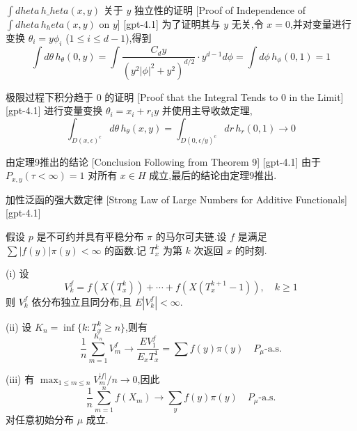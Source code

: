 \documentclass[UTF8]{ctexart}
\begin{document}
    
    
    \begin{prf}
        {$\int d	heta\, h\_	heta(x, y)$ 关于 $y$ 独立性的证明}
        [Proof of Independence of $\int d	heta\, h_	heta(x, y)$ on $y$]
        [gpt-4.1]
        为了证明其与 $y$ 无关,令 $x = 0$,并对变量进行变换 $\theta_i = y \phi_i$ ($1 \leq i \leq d-1$),得到
\[
\int d\theta\, h_\theta(0, y) = \int \frac{C_d y}{(y^2 |\phi|^2 + y^2)^{d/2}} \cdot y^{d-1} d\phi = \int d\phi\, h_\phi(0, 1) = 1
\]

    \end{prf}
    
    
    
    \begin{prf}
        {极限过程下积分趋于 $0$ 的证明}
        [Proof that the Integral Tends to $0$ in the Limit]
        [gpt-4.1]
        进行变量变换 $\theta_i = x_i + r_i y$ 并使用主导收敛定理,
\[
\int_{D(x, \epsilon)^c} d\theta\, h_\theta(x, y) = \int_{D(0, \epsilon / y)^c} dr\, h_r(0, 1) \to 0
\]

    \end{prf}
    
    
    
    \begin{crl}
        {由定理9推出的结论}
        [Conclusion Following from Theorem 9]
        [gpt-4.1]
        由于 $P_{x, y}(\tau < \infty) = 1$ 对所有 $x \in H$ 成立,最后的结论由定理9推出.
    \end{crl}
    
    
    
    \begin{thm}
        {加性泛函的强大数定律}
        [Strong Law of Large Numbers for Additive Functionals]
        [gpt-4.1]
        
假设 $p$ 是不可约并具有平稳分布 $\pi$ 的马尔可夫链.设 $f$ 是满足 $\sum |f(y)| \pi(y) < \infty$ 的函数.记 $T_{x}^{k}$ 为第 $k$ 次返回 $x$ 的时刻.

(i) 设
\[
V_{k}^{f} = f(X(T_{x}^{k})) + \cdots + f(X(T_{x}^{k+1} - 1)),\quad k \geq 1
\]
则 $V_{k}^{f}$ 依分布独立且同分布,且 $E|V_{k}^{f}| < \infty$.

(ii) 设 $K_{n} = \inf\{k : T_{x}^{k} \geq n\}$,则有
\[
\frac{1}{n} \sum_{m=1}^{K_{n}} V_{m}^{f} \to \frac{E V_{1}^{f}}{E_{x} T_{x}^{1}} = \sum f(y) \pi(y) \quad P_{\mu}\text{-a.s.}
\]

(iii) 有 $\max_{1 \leq m \leq n} V_{m}^{|f|} / n \to 0$,因此
\[
\frac{1}{n} \sum_{m=1}^{n} f(X_{m}) \to \sum_{y} f(y) \pi(y) \quad P_{\mu}\text{-a.s.}
\]
对任意初始分布 $\mu$ 成立.

    \end{thm}
    
\end{document}
